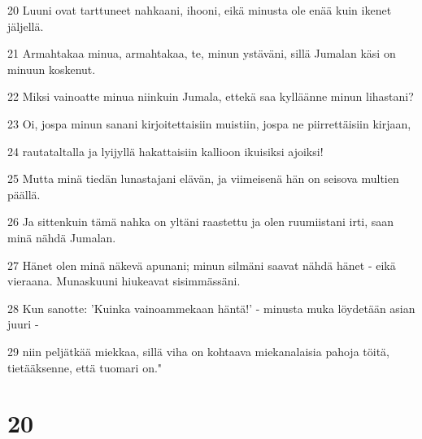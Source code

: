 \par 20 Luuni ovat tarttuneet nahkaani, ihooni, eikä minusta ole enää kuin ikenet jäljellä.
\par 21 Armahtakaa minua, armahtakaa, te, minun ystäväni, sillä Jumalan käsi on minuun koskenut.
\par 22 Miksi vainoatte minua niinkuin Jumala, ettekä saa kylläänne minun lihastani?
\par 23 Oi, jospa minun sanani kirjoitettaisiin muistiin, jospa ne piirrettäisiin kirjaan,
\par 24 rautataltalla ja lyijyllä hakattaisiin kallioon ikuisiksi ajoiksi!
\par 25 Mutta minä tiedän lunastajani elävän, ja viimeisenä hän on seisova multien päällä.
\par 26 Ja sittenkuin tämä nahka on yltäni raastettu ja olen ruumiistani irti, saan minä nähdä Jumalan.
\par 27 Hänet olen minä näkevä apunani; minun silmäni saavat nähdä hänet - eikä vieraana. Munaskuuni hiukeavat sisimmässäni.
\par 28 Kun sanotte: 'Kuinka vainoammekaan häntä!' - minusta muka löydetään asian juuri -
\par 29 niin peljätkää miekkaa, sillä viha on kohtaava miekanalaisia pahoja töitä, tietääksenne, että tuomari on."

\chapter{20}

